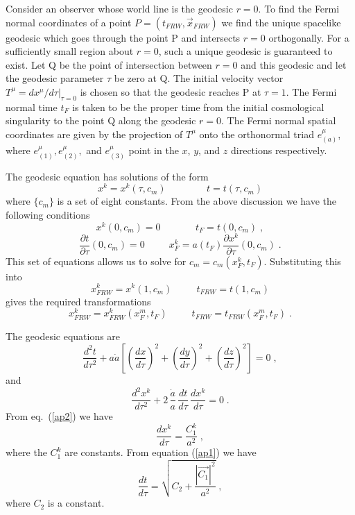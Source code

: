 Consider an observer whose world line is the geodesic
$r=0$. To find the Fermi normal coordinates of a 
point $P=(t_{FRW},\vec{x}_{FRW})$ we find the unique spacelike geodesic
which goes through the point P and intersects $r=0$ orthogonally. For a
sufficiently small region about $r=0$, such a unique geodesic is
guaranteed
to exist. Let Q be the point of intersection between $r=0$ and this
geodesic and let the geodesic parameter $\tau$ be zero at Q.
The initial velocity vector $T^{\mu}=dx^{\mu}/d\tau|_{\tau=0}$
is chosen so that the geodesic reaches P at $\tau=1$. The Fermi normal time
$t_F$ is taken to be the proper time from the 
initial cosmological singularity to the point Q
along the geodesic $r=0$. The Fermi normal spatial coordinates are given by the
projection of $T^{\mu}$ onto the orthonormal triad $e^{\mu}_{(a)}$, where
$e^{\mu}_{(1)}, e^{\mu}_{(2)},$ and $e^{\mu}_{(3)}$ point in the $x$, $y$,
and $z$ directions respectively.

\def\theequation{A.\arabic{equation}}
\setcounter{equation}{0}
   
The geodesic equation has solutions of the form
\begin{equation}
x^k=x^k(\tau,c_m)\;\;\;\;\;\;\;\;\;\;\;\;\;\;\; t=t(\tau,c_m)
\end{equation}
where $\{c_m\}$ is a set of eight constants. From the above discussion we
have the following conditions
\begin{equation}
x^k(0,c_m)=0\;\;\;\;\;\;\;\;\;\;\;\;\; t_F=t(0,c_m) \; ,
\end{equation}
\begin{equation}
\frac{\partial t}{\partial\tau}(0,c_m)=0\;\;\;\;\;\;\;\;\; x_F^k=
a(t_F)\frac{\partial x^k}{\partial\tau}(0,c_m) \; .
\end{equation}
This set of equations allows us to solve for $c_m=c_m(x_F^k,t_F)$.
Substituting this into
\begin{equation}
x^k_{FRW}=x^k(1,c_m)\;\;\;\;\;\;\;\;\; t_{FRW}=t(1,c_m) 
\end{equation}
gives the required transformations
\begin{equation}
x^k_{FRW}=x^k_{FRW}(x_F^m,t_F)\;\;\;\;\;\;\;\;\;
t_{FRW}=t_{FRW}(x^m_F,t_F) \; .
\end{equation}
   
The geodesic equations are
\begin{equation}
\frac{d^2t}{d\tau^2}+a\dot{a}\left[\left(\frac{dx}{d\tau}\right)^2+
\left(\frac{dy}{d\tau}\right)^2+
\left(\frac{dz}{d\tau}\right)^2\right]=0 \; ,
\label{ap1}
\end{equation}
and
\begin{equation}
\frac{d^2x^k}{d\tau^2}+2\, 
\frac{\dot{a}}{a} \, \frac{dt}{d\tau} \, \frac{dx^k}{d\tau}=0 \; .
\label{ap2}
\end{equation}
From eq.~(\ref{ap2}) we have
\begin{equation}
\frac{dx^k}{d\tau}=\frac{C_1^k}{a^2} \; , 
\end{equation}
where the $C_1^k$ are constants. From equation (\ref{ap1}) we have
\begin{equation}
\frac{dt}{d\tau}=\sqrt{C_2+\frac{|\vec{C_1}|^2}{a^2}} \; , 
\end{equation}
where $C_2$ is a constant.
  
